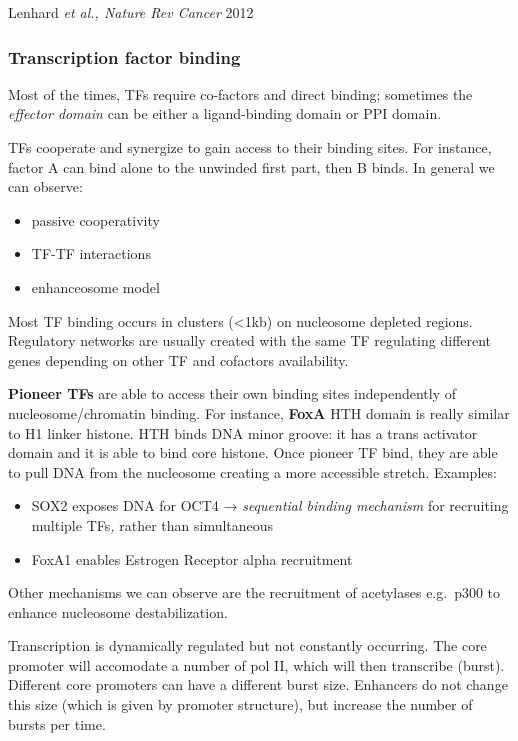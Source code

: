 Lenhard \emph{et al., Nature Rev Cancer} 2012

\hypertarget{transcription-factor-binding}{%
\subsubsection{Transcription factor binding}\label{transcription-factor-binding}}

Most of the times, TFs require co-factors and direct binding; sometimes the \emph{effector domain} can be either a ligand-binding domain or PPI domain.

TFs cooperate and synergize to gain access to their binding sites. For instance, factor A can bind alone to the unwinded first part, then B binds. In general we can observe:

\begin{itemize}
\tightlist
\item
  passive cooperativity
\item
  TF-TF interactions
\item
  enhanceosome model
\end{itemize}

Most TF binding occurs in clusters (\textless1kb) on nucleosome depleted regions. Regulatory networks are usually created with the same TF regulating different genes depending on other TF and cofactors availability.

\textbf{Pioneer TFs} are able to access their own binding sites independently of nucleosome/chromatin binding. For instance, \textbf{FoxA} HTH domain is really similar to H1 linker histone. HTH binds DNA minor groove: it has a trans activator domain and it is able to bind core histone. Once pioneer TF bind, they are able to pull DNA from the nucleosome creating a more accessible stretch. Examples:

\begin{itemize}
\tightlist
\item
  SOX2 exposes DNA for OCT4 → \emph{sequential binding mechanism} for recruiting multiple TFs\emph{,} rather than simultaneous
\item
  FoxA1 enables Estrogen Receptor alpha recruitment
\end{itemize}

Other mechanisms we can observe are the recruitment of acetylases e.g.~p300 to enhance nucleosome destabilization.

Transcription is dynamically regulated but not constantly occurring. The core promoter will accomodate a number of pol II, which will then transcribe (burst). Different core promoters can have a different burst size. Enhancers do not change this size (which is given by promoter structure), but increase the number of bursts per time.

